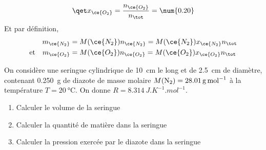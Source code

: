 \documentclass[a4paper, 10pt, final, garamond]{book}
\begin{document}
\begin{enumerate}[label=\sqenumi, leftmargin=10pt]
\begin{isd}
{\begin{gather*}
				\qet
				x_{\ce{O_2}} = \frac{n_{\ce{O_2}}}{n_{\tot}} = \num{0.20}
			\end{gather*}
			Et par définition,
			\begin{align*}
				m_{\ce{N_2}} & = M(\ce{N_2})n_{\ce{N_2}} = M(\ce{N_2})x_{\ce{N_2}}n_{\tot}
				\\\text{et}\quad
				m_{\ce{O_2}} & = M(\ce{O_2})n_{\ce{O_2}} = M(\ce{O_2})x_{\ce{O_2}}n_{\tot}
			\end{align*}
		}
		\tcblower
	\end{isd}
	On considère une seringue cylindrique de \SI{10}{cm} le long et de
	\SI{2.5}{cm} de diamètre, contenant \SI{0.250}{g} de diazote de masse
	molaire $M({\rm N}_2) = \SI{28.01}{g.mol^{-1}}$ à la
	température $T = \SI{20}{\degreeCelsius}$. On donne $R =
		\SI{8.314}{J.K^{-1}.mol^{-1}}$.
	\smallbreak
	\begin{isd}[sidebyside align=top]
		\begin{enumerate}
			\item Calculer le volume de la seringue
			\item Calculer la quantité de matière dans la seringue
			\item Calculer la pression exercée par le diazote dans la seringue
		\end{enumerate}
		\tcblower
		\wsw{
			\begin{enumerate}

\end{enumerate}}
\end{isd}
\end{enumerate}
\end{document}
